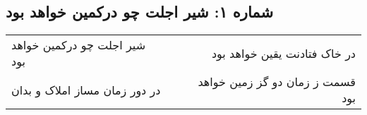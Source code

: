 \begin{center}
\section*{شماره ۱: شیر اجلت چو درکمین خواهد بود}
\label{sec:001}
\begin{longtable}{l p{0.5cm} r}
شیر اجلت چو درکمین خواهد بود
&&
در خاک فتادنت یقین خواهد بود
\\
در دور زمان مساز املاک و بدان
&&
قسمت ز زمان دو گز زمین خواهد بود
\\
\end{longtable}
\end{center}
